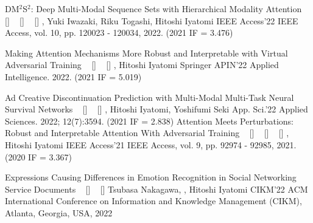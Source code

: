 \begin{publications}
    \ijpublication
    {DM$^2$S$^2$: Deep Multi-Modal Sequence Sets with Hierarchical Modality Attention}
    {
    ~ [\href{https://doi.org/10.1109/ACCESS.2022.3221812}{\small{\doiSymbol}}]
    ~ [\href{https://arxiv.org/abs/2209.03126}{\small{\arxivSymbol}}]
    ~ [\href{https://doi.org/10.5281/zenodo.7050923}{\small{\linkSymbol}}]
    }
    {\underline{}, Yuki Iwazaki, Riku Togashi, Hitoshi Iyatomi}
    {IEEE Access'22} {IEEE Access, vol. 10, pp. 120023 - 120034, 2022. (2021 IF = 3.476)}

    \ijpublication
    {Making Attention Mechanisms More Robust and Interpretable with Virtual Adversarial Training}
    {
    ~ [\href{https://doi.org/10.1007/s10489-022-04301-w}{\small{\doiSymbol}}]
    ~ [\href{https://arxiv.org/abs/2104.08763}{\small{\arxivSymbol}}]
    }
    {\underline{}, Hitoshi Iyatomi}
    {Springer APIN'22} {Applied Intelligence. 2022. (2021 IF = 5.019)}

    \ijpublication
    {Ad Creative Discontinuation Prediction with Multi-Modal Multi-Task Neural Survival Networks}
    {
    ~ [\href{https://doi.org/10.3390/app12073594}{\small{\doiSymbol}}]
    ~ [\href{https://arxiv.org/abs/2204.11588}{\small{\arxivSymbol}}]
    }
    {\underline{}, Hitoshi Iyatomi, Yoshifumi Seki}
    {App. Sci.'22} {Applied Sciences. 2022; 12(7):3594. (2021 IF = 2.838)}
    \ijpublication
    {Attention Meets Perturbations: Robust and Interpretable Attention With Adversarial Training}
    {
    ~ [\href{https://doi.org/10.1109/ACCESS.2021.3093456}{\small{\doiSymbol}}]
    ~ [\href{https://arxiv.org/abs/2009.12064}{\small{\arxivSymbol}}]
    ~ [\href{https://github.com/shunk031/attention-meets-perturbation}{\small{\githubSymbol}}]
    }
    {\underline{}, Hitoshi Iyatomi}
    {IEEE Access'21} {IEEE Access, vol. 9, pp. 92974 - 92985, 2021. (2020 IF = 3.367)}

    \icpublication
    {Expressions Causing Differences in Emotion Recognition in Social Networking Service Documents}
    {
    ~ [\href{https://doi.org/10.1145/3511808.3557599}{\small{\doiSymbol}}]
    ~ [\href{https://arxiv.org/abs/2208.14244}{\small{\arxivSymbol}}]
    }
    {Tsubasa Nakagawa, \underline{}, Hitoshi Iyatomi}
    {CIKM'22} {ACM International Conference on Information and Knowledge Management (CIKM), Atlanta, Georgia, USA, 2022}


\end{publications}
